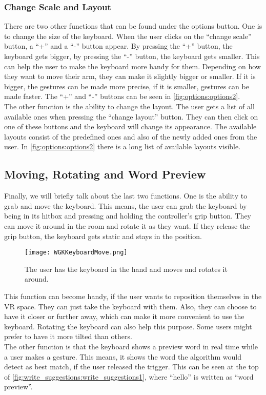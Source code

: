 \subsubsection{Change Scale and Layout}
There are two other functions that can be found under the options button. One is to change the size of the keyboard. When the user clicks on the ``change scale'' button, a ``+'' and a ``-'' button appear. By pressing the ``+'' button, the keyboard gets bigger, by pressing the ``-'' button, the keyboard gets smaller. This can help the user to make the keyboard more handy for them. Depending on how they want to move their arm, they can make it slightly bigger or smaller. If it is bigger, the gestures can be made more precise, if it is smaller, gestures can be made faster. The ``+'' and ``-'' buttons can be seen in \cref{fig:options:options2}.\\
The other function is the ability to change the layout. The user gets a list of all available ones when pressing the ``change layout'' button. They can then click on one of these buttons and the keyboard will change its appearance. The available layouts consist of the predefined ones and also of the newly added ones from the user. In \cref{fig:options:options2} there is a long list of available layouts visible.

\subsection{Moving, Rotating and Word Preview}
Finally, we will briefly talk about the last two functions. One is the ability to grab and move the keyboard. This means, the user can grab the keyboard by being in its hitbox and pressing and holding the controller's grip button. They can move it around in the room and rotate it as they want. If they release the grip button, the keyboard gets static and stays in the position.
\begin{figure}[H]
    \centering
    \texttt{[image: WGKKeyboardMove.png]}
    \caption{The user has the keyboard in the hand and moves and rotates it around.}
    \label{fig:move}
\end{figure}
This function can become handy, if the user wants to reposition themselves in the VR space. They can just take the keyboard with them. Also, they can choose to have it closer or further away, which can make it more convenient to use the keyboard. Rotating the keyboard can also help this purpose. Some users might prefer to have it more tilted than others.\\
The other function is that the keyboard shows a preview word in real time while a user makes a gesture. This means, it shows the word the algorithm would detect as best match, if the user released the trigger. This can be seen at the top of \cref{fig:write_suggestions:write_suggestions1}, where ``hello'' is written as ``word preview''.